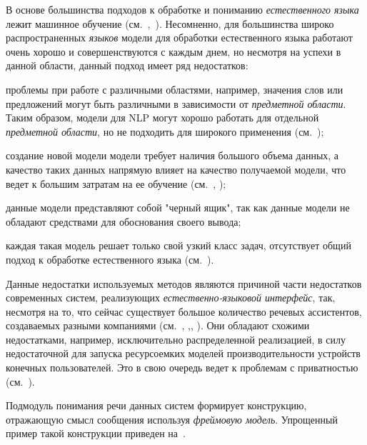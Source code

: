 В основе большинства подходов к обработке и пониманию \textit{естественного языка} лежит машинное обучение (см.~,~).
Несомненно, для большинства широко распространенных \textit{языков} модели для обработки естественного языка работают очень хорошо и совершенствуются с каждым днем, но несмотря на успехи в данной области, данный подход имеет ряд недостатков:
\begin{textitemize}
    \item проблемы при работе с различными областями, например, значения слов или предложений могут быть различными в зависимости от \textit{предметной области}.
    Таким образом, модели для NLP могут хорошо работать для отдельной \textit{предметной области}, но не подходить для широкого применения (см.~);
    \item создание новой модели модели требует наличия большого объема данных, а качество таких данных напрямую влияет на качество получаемой модели, что ведет к большим затратам на ее обучение (см.~, );
    \item данные модели представляют собой "черный ящик"{}, так как данные модели не обладают средствами для обоснования своего вывода;
    \item каждая такая модель решает только свой узкий класс задач, отсутствует общий подход к обработке естественного языка (см.~).
\end{textitemize}

Данные недостатки используемых методов являются причиной части недостатков современных систем, реализующих \textit{естественно-языковой интерфейс}, так, несмотря на то, что сейчас существует большое количество речевых ассистентов, создаваемых разными компаниями (см.~, ,, ).
Они обладают схожими недостатками, например, исключительно распределенной реализацией, в силу недостаточной для запуска ресурсоемких моделей производительности устройств конечных пользователей.
Это в свою очередь ведет к проблемам с приватностью (см.~).

Подмодуль понимания речи данных систем формирует конструкцию, отражающую смысл сообщения используя \textit{фреймовую модель}.
Упрощенный пример такой конструкции приведен на~\textit{}.

